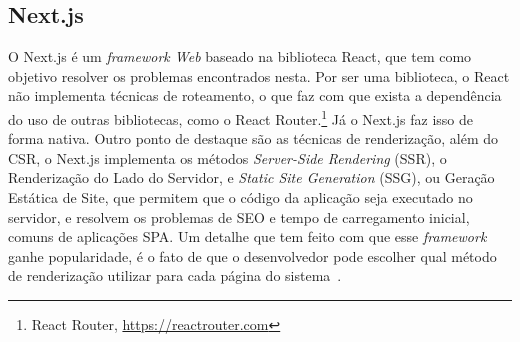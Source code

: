 \subsection{Next.js}
\label{sec-fundteo-framework-next}
O Next.js é um \textit{framework Web} baseado na biblioteca React, que tem como objetivo 
resolver os problemas encontrados nesta. Por ser uma biblioteca, o React não implementa 
técnicas de roteamento, o que faz com que exista a dependência do uso de outras bibliotecas, 
como o React Router.\footnote{React Router, \url{https://reactrouter.com}}
Já o Next.js faz isso de forma nativa. Outro ponto de destaque são as técnicas de renderização, 
além do CSR, o Next.js implementa os métodos \textit{Server-Side Rendering} (SSR), o Renderização do Lado do Servidor,
e \textit{Static Site Generation} (SSG), ou Geração Estática de Site, que permitem que o código da aplicação seja executado
no servidor, e resolvem os problemas de SEO e tempo de carregamento inicial, comuns de 
aplicações SPA. Um detalhe que tem feito com que esse \textit{framework}
ganhe popularidade, é o fato de que o desenvolvedor pode escolher qual método de renderização
utilizar para cada página do sistema~\cite{nextjs:2023}.

